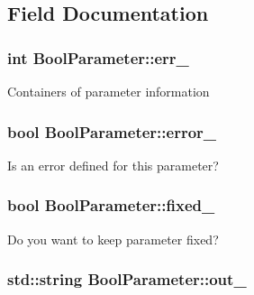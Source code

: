 \subsection{Field Documentation}
\hypertarget{class_bool_parameter_a21d7587dbe2a95be0329ef9933ff041d}{
\subsubsection[{err\-\_\-}]{\setlength{\rightskip}{0pt plus 5cm}int Bool\-Parameter\-::err\-\_\-\hspace{0.3cm}{\ttfamily [protected]}}}\label{class_bool_parameter_a21d7587dbe2a95be0329ef9933ff041d}
Containers of parameter information \hypertarget{class_bool_parameter_a9c192361dd600e72bbf06eee33fa0899}{
\subsubsection[{error\-\_\-}]{\setlength{\rightskip}{0pt plus 5cm}bool Bool\-Parameter\-::error\-\_\-\hspace{0.3cm}{\ttfamily [protected]}}}\label{class_bool_parameter_a9c192361dd600e72bbf06eee33fa0899}
Is an error defined for this parameter? \hypertarget{class_bool_parameter_acaa36aae968e133f21b2cebb6216dee9}{
\subsubsection[{fixed\-\_\-}]{\setlength{\rightskip}{0pt plus 5cm}bool Bool\-Parameter\-::fixed\-\_\-\hspace{0.3cm}{\ttfamily [protected]}}}\label{class_bool_parameter_acaa36aae968e133f21b2cebb6216dee9}
Do you want to keep parameter fixed? \hypertarget{class_bool_parameter_a836a9f6e5b814156665c2de8c00c31a2}{
\subsubsection[{out\-\_\-}]{\setlength{\rightskip}{0pt plus 5cm}std\-::string Bool\-Parameter\-::out\-\_\-\hspace{0.3cm}{\ttfamily [protected]}}}\label{class_bool_parameter_a836a9f6e5b814156665c2de8c00c31a2}
